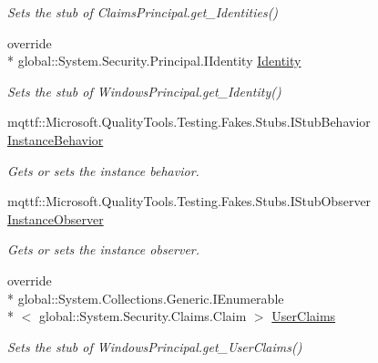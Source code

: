 \begin{DoxyCompactItemize}
\begin{DoxyCompactList}\small\item\em Sets the stub of Claims\-Principal.\-get\-\_\-\-Identities()\end{DoxyCompactList}\item 
override \\*
global\-::\-System.\-Security.\-Principal.\-I\-Identity \hyperlink{class_system_1_1_security_1_1_principal_1_1_fakes_1_1_stub_windows_principal_ae83e497a9ac746495144e663363e76b3}{Identity}
\begin{DoxyCompactList}\small\item\em Sets the stub of Windows\-Principal.\-get\-\_\-\-Identity()\end{DoxyCompactList}\item 
mqttf\-::\-Microsoft.\-Quality\-Tools.\-Testing.\-Fakes.\-Stubs.\-I\-Stub\-Behavior \hyperlink{class_system_1_1_security_1_1_principal_1_1_fakes_1_1_stub_windows_principal_a5f8dd8ea5ca77fe3c1307eb66d840971}{Instance\-Behavior}
\begin{DoxyCompactList}\small\item\em Gets or sets the instance behavior.\end{DoxyCompactList}\item 
mqttf\-::\-Microsoft.\-Quality\-Tools.\-Testing.\-Fakes.\-Stubs.\-I\-Stub\-Observer \hyperlink{class_system_1_1_security_1_1_principal_1_1_fakes_1_1_stub_windows_principal_a31273b78f9fc89cea999501da6892264}{Instance\-Observer}
\begin{DoxyCompactList}\small\item\em Gets or sets the instance observer.\end{DoxyCompactList}\item 
override \\*
global\-::\-System.\-Collections.\-Generic.\-I\-Enumerable\\*
$<$ global\-::\-System.\-Security.\-Claims.\-Claim $>$ \hyperlink{class_system_1_1_security_1_1_principal_1_1_fakes_1_1_stub_windows_principal_a3c49849dcf4f14c715aff1d8ee981dba}{User\-Claims}
\begin{DoxyCompactList}\small\item\em Sets the stub of Windows\-Principal.\-get\-\_\-\-User\-Claims()\end{DoxyCompactList}\end{DoxyCompactItemize}


